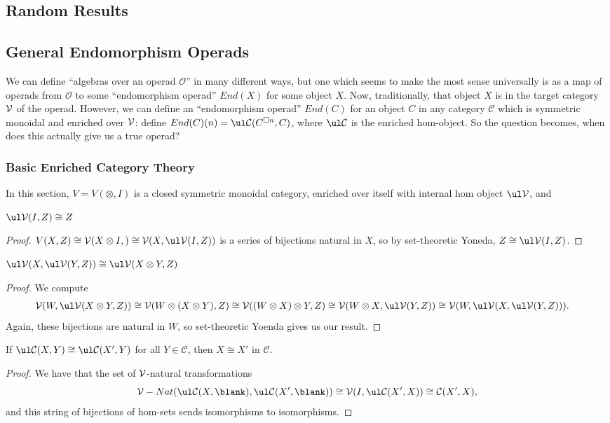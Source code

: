 \documentclass{report}
\renewcommand{\C}{\text{$\mathcal{C}$}}
\renewcommand{\O}{\text{$\mathcal{O}$}}
\begin{document}
\begin{appendices}
  \chapter{Random Results}
\section{General Endomorphism Operads}
We can define ``algebras over an operad $\O$'' in many different ways, but one which seems to make the most sense universally is as a map of operads from $\O$ to some ``endomorphism operad'' $End(X)$ for some object $X$. Now, traditionally, that object $X$ is in the target category $\text{$\mathcal{V}$}$ of the operad. However, we can define an ``endomorphism operad'' $End(C)$ for an object $C$ in any category $\C$ which is symmetric monoidal and enriched over $\text{$\mathcal{V}$}$: define $End(C)(n) = \ul\C(C^{\Box n},C)$, where $\ul\C$ is the enriched hom-object. So the question becomes, when does this actually give us a true operad?

\subsection{Basic Enriched Category Theory}
In this section, $V = V(\otimes, I)$ is a closed symmetric monoidal category, enriched over itself with internal hom object $\ul\V$, and 
\newcommand{\uV}{\text{$\ul\V$}}
\newcommand{\uC}{\text{$\ul\C$}}
\begin{lemma}\label{claim1}
  $\ul\V(I,Z) \cong Z$
\end{lemma}
\begin{proof}
  $V(X,Z)\cong \V(X\otimes I, ) \cong \V(X,\uV(I,Z))$ is a series of bijections natural in $X$, so by set-theoretic Yoneda, $Z\cong \uV(I,Z)$. 
\end{proof}

\begin{lemma}\label{claim2}
  $\uV(X,\uV(Y,Z))\cong\uV(X\otimes Y, Z)$
\end{lemma}
\begin{proof}
  We compute
  \begin{align*}
    \V(W,\uV(X\otimes Y,Z)) &\cong \V(W\otimes (X\otimes Y),Z)\cong \V((W\otimes X)\otimes Y,Z)\cong \V(W\otimes X, \uV(Y,Z))\cong \V(W,\uV(X,\uV(Y,Z))).
  \end{align*}
Again, these bijections are natural in $W$, so set-theoretic Yoenda gives us our result.
\end{proof}

\begin{lemma}\label{claim3}
  If $\uC(X,Y)\cong \uC(X',Y)$ for all $Y\in\C$, then $X\cong X'$ in $\C$.
\end{lemma}
\begin{proof}
  We have that the set of $\text{$\mathcal{V}$}$-natural transformations
\[\V-Nat(\uC(X,\blank), \ul\C(X',\blank)) \cong \V(I,\ul\C(X',X))\cong \C(X',X),\]
and this string of bijections of hom-sets sends isomorphisms to isomorphisms. 
\end{proof}


\end{appendices}
\end{document}
